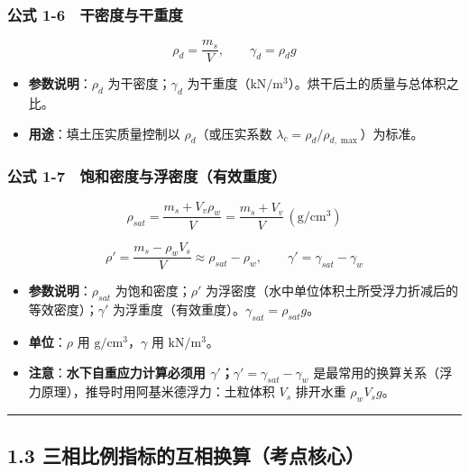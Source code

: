 \documentclass[
]{article}
\providecommand{\tightlist}{%
  \setlength{\itemsep}{0pt}\setlength{\parskip}{0pt}}
\begin{document}
\subsubsection{公式
1-6　干密度与干重度}\label{ux516cux5f0f-1-6-ux5e72ux5bc6ux5ea6ux4e0eux5e72ux91cdux5ea6}

\[\rho_d=\frac{m_s}{V},\qquad \gamma_d=\rho_d g\]

\begin{itemize}
\tightlist
\item
  \textbf{参数说明}：\(\rho_d\) 为干密度；\(\gamma_d\)
  为干重度（\(\mathrm{kN/m^3}\)）。烘干后土的质量与总体积之比。
\item
  \textbf{用途}：填土压实质量控制以 \(\rho_d\)（或压实系数
  \(\lambda_c=\rho_d/\rho_{d,\max}\)）为标准。
\end{itemize}

\subsubsection{公式
1-7　饱和密度与浮密度（有效重度）}\label{ux516cux5f0f-1-7-ux9971ux548cux5bc6ux5ea6ux4e0eux6d6eux5bc6ux5ea6ux6709ux6548ux91cdux5ea6}

\[\rho_{sat}=\frac{m_s+V_v\rho_w}{V}=\frac{m_s+V_v}{V}\,\mathrm{(g/cm^3)}\]

\[\rho'=\frac{m_s-\rho_w V_s}{V}\approx\rho_{sat}-\rho_w,\qquad \gamma'=\gamma_{sat}-\gamma_w\]

\begin{itemize}
\tightlist
\item
  \textbf{参数说明}：\(\rho_{sat}\) 为饱和密度；\(\rho'\)
  为浮密度（水中单位体积土所受浮力折减后的等效密度）；\(\gamma'\)
  为浮重度（有效重度）。\(\gamma_{sat}=\rho_{sat}g\)。
\item
  \textbf{单位}：\(\rho\) 用 \(\mathrm{g/cm^3}\)，\(\gamma\) 用
  \(\mathrm{kN/m^3}\)。
\item
  \textbf{注意}：\textbf{水下自重应力计算必须用
  \(\gamma'\)；\(\gamma'=\gamma_{sat}-\gamma_w\)}
  是最常用的换算关系（浮力原理），推导时用阿基米德浮力：土粒体积 \(V_s\)
  排开水重 \(\rho_w V_s g\)。
\end{itemize}

\begin{center}\rule{0.5\linewidth}{0.5pt}\end{center}

\subsection{1.3
三相比例指标的互相换算（考点核心）}\label{ux4e09ux76f8ux6bd4ux4f8bux6307ux6807ux7684ux4e92ux76f8ux6362ux7b97ux8003ux70b9ux6838ux5fc3}
\end{document}
